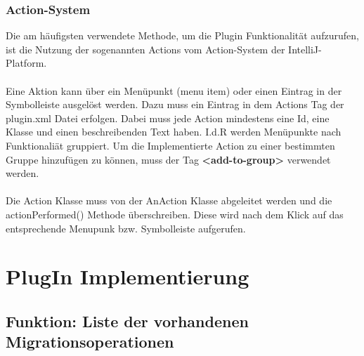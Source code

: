 	\subsubsection*{Action-System}
	Die am häufigsten verwendete Methode, um die Plugin Funktionalität aufzurufen, ist die Nutzung der sogenannten Actions vom Action-System der IntelliJ-Platform.\\ \\
	Eine Aktion kann über ein Menüpunkt (menu item) oder einen Eintrag in der Symbolleiste ausgelöst werden. Dazu muss ein Eintrag in dem Actions Tag der plugin.xml Datei erfolgen. Dabei muss jede Action mindestens eine Id, eine Klasse und einen beschreibenden Text haben. I.d.R werden Menüpunkte nach Funktionaliät gruppiert. Um die Implementierte Action zu einer bestimmten Gruppe hinzufügen zu können, muss der Tag \textbf{<add-to-group>} verwendet werden.\\ \\
	Die Action Klasse muss von der AnAction Klasse abgeleitet werden und die actionPerformed() Methode überschreiben. Diese wird nach dem Klick auf das entsprechende Menupunk bzw. Symbolleiste aufgerufen.

\section{PlugIn Implementierung}
\subsection{Funktion: Liste der vorhandenen Migrationsoperationen}

